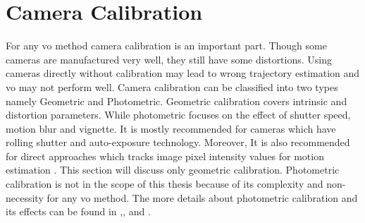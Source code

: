 \section{Camera Calibration}
For any \acrshort{vo} method camera calibration is an important part. Though some cameras are manufactured very well, they still have some distortions. Using cameras directly without calibration may lead to wrong trajectory estimation and \acrshort{vo} may not perform well. Camera calibration can be classified into two types namely Geometric and Photometric. Geometric calibration covers intrinsic and distortion parameters. While photometric focuses on the effect of shutter speed, motion blur and vignette. It is mostly recommended for cameras which have rolling shutter and auto-exposure technology. Moreover, It is also recommended for direct approaches which tracks image pixel intensity values for motion estimation \cite{yang2018challenges}. This section will discuss only geometric calibration. Photometric calibration is not in the scope of this thesis because of its complexity and non-necessity for any \acrshort{vo} method. The more details about photometric calibration and its effects can be found in \cite{yang2018challenges} ,\cite{photometrically}, \cite{bergmann2017online} and \cite{vignette}.\\

